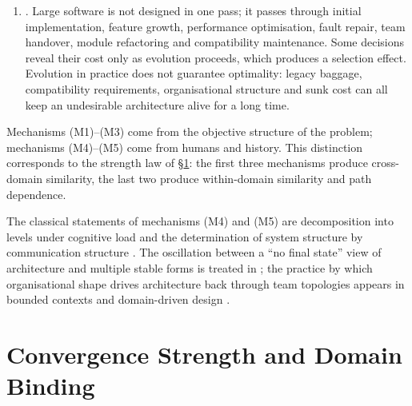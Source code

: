 \begin{enumerate}[label=(M\arabic*)]
      the limits of developer comprehension. If implicit relations hold between all
      components, then even a system that runs in the computational sense leaves its
      developers unable to predict the effect of a change. Humans therefore tend to build
      hierarchies, namespaces, modules, explicit interfaces, composable abstractions and
      locally comprehensible state. \emph{Software architecture organises not only
      computation but comprehensibility under bounded cognition.}
\item {}. Large software is not designed in one pass; it passes
      through initial implementation, feature growth, performance optimisation, fault repair,
      team handover, module refactoring and compatibility maintenance. Some decisions reveal
      their cost only as evolution proceeds, which produces a selection effect. Evolution in
      practice does not guarantee optimality: legacy baggage, compatibility requirements,
      organisational structure and sunk cost can all keep an undesirable architecture alive
      for a long time.
\end{enumerate}

Mechanisms (M1)--(M3) come from the objective structure of the problem; mechanisms (M4)--(M5)
come from humans and history. This distinction corresponds to the strength law of
\S\ref{sec:strength}: the first three mechanisms produce cross-domain similarity, the last
two produce within-domain similarity and path dependence.

The classical statements of mechanisms (M4) and (M5) are decomposition into levels under
cognitive load \cite{simon1962} and the determination of system structure by communication
structure \cite{conway1968}. The oscillation between a ``no final state'' view of
architecture and multiple stable forms is treated in \cite{nygard2018}; the practice by
which organisational shape drives architecture back through team topologies appears in
bounded contexts and domain-driven design \cite{evans2003}.

\section{Convergence Strength and Domain Binding}\label{sec:strength}

